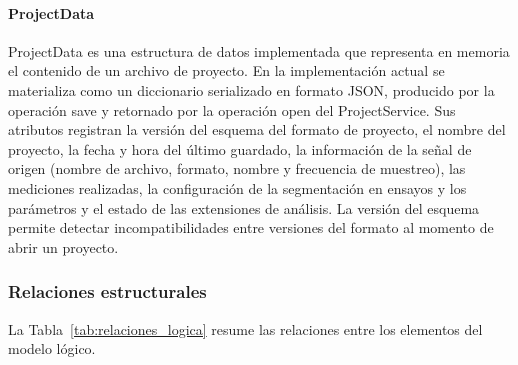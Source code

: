 \documentclass[11pt,a4paper]{article}
\DeclareRobustCommand{\_}{\textunderscore\allowbreak}
\begin{document}
\paragraph{ProjectData}
ProjectData es una estructura de datos implementada que representa en memoria el contenido de un archivo de proyecto. En la implementación actual se materializa como un diccionario serializado en formato JSON, producido por la operación save y retornado por la operación open del ProjectService. Sus atributos registran la versión del esquema del formato de proyecto, el nombre del proyecto, la fecha y hora del último guardado, la información de la señal de origen (nombre de archivo, formato, nombre y frecuencia de muestreo), las mediciones realizadas, la configuración de la segmentación en ensayos y los parámetros y el estado de las extensiones de análisis. La versión del esquema permite detectar incompatibilidades entre versiones del formato al momento de abrir un proyecto.

\subsubsection{Relaciones estructurales}

La Tabla~\ref{tab:relaciones_logica} resume las relaciones entre los elementos del modelo lógico.
\end{document}
